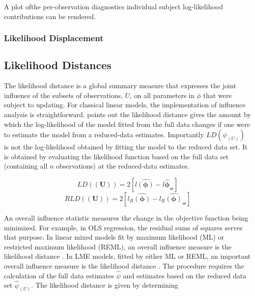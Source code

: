 \documentclass[12pt, a4paper]{report}
\theoremstyle{plain}
\theoremstyle{definition}
\theoremstyle{remark}
\begin{document}
A plot ofthe per-observation diagnostics individual subject log-likelihood contributions can be rendered.

\subsubsection*{Likelihood Displacement}

\subsection{Likelihood Distances}

The  likelihood distance is a global summary measure that expresses the joint influence of the subsets of observations, $U$, on all parameters in $\phi$ that were subject to updating. For classical linear models, the implementation of influence analysis is straightforward. \citet{schab} points out the likelihood distance gives the amount by which the log-likelihood of the model fitted from the full data changes if one were
to estimate the model from a reduced-data estimates. Importantly $LD(\psi_{(U)})$ is not the log-likelihood obtained by fitting the model to the reduced data set. It is obtained by evaluating the likelihood function based on the full data set (containing all $n$ observations) at the reduced-data estimates.


\[  LD(\boldsymbol{(U)})= 2[l\boldsymbol{\hat{(\phi)}} - l\boldsymbol{\hat{\phi}_\omega} ] \]
\[  RLD(\boldsymbol{(U)})= 2[ l_R\boldsymbol{\hat{(\phi)}} - l_R\boldsymbol{\hat{(\phi)}_\omega} ] \]


An overall influence statistic measures the change in the objective function being minimized. For example, in
OLS regression, the residual sums of squares serves that purpose. In linear mixed models fit by
 maximum likelihood (ML) or  restricted maximum likelihood (REML), an overall influence measure is the  likelihood distance \citep{cook}. In LME models, fitted by either ML or REML, an important overall
influence measure is the likelihood distance \citep{cook82}. The  procedure requires the calculation of the full data estimates
$\hat{\psi}$ and estimates based on the reduced data set  $\hat{\psi}_{(U)}$. The likelihood distance is given by
determining
\end{document}
